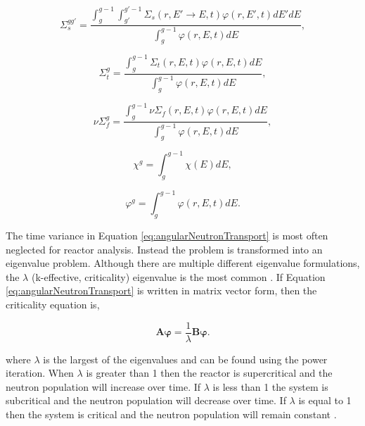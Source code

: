\begin{equation}
    \Sigma_{s}^{gg'} = \frac{\int_{g}^{g-1}\int_{g'}^{g'-1}\Sigma_{s}(r,E'\rightarrow E,t)\varphi(r,E',t) dE'dE}{\int_{g}^{g-1}\varphi(r,E,t) dE},
\end{equation}

\begin{equation}
    \Sigma_{t}^{g} = \frac{\int_{g}^{g-1}\Sigma_{t}(r,E,t)\varphi(r,E,t) dE}{\int_{g}^{g-1}\varphi(r,E,t) dE},
\end{equation}

\begin{equation}
    \nu\Sigma_{f}^{g} = \frac{\int_{g}^{g-1}\nu\Sigma_{f}(r,E,t)\varphi(r,E,t) dE}{\int_{g}^{g-1}\varphi(r,E,t) dE},
\end{equation}

\begin{equation}
    \chi^{g} = \int_{g}^{g-1}\chi(E) dE,
\end{equation}

\begin{equation}
    \varphi^{g} = \int_{g}^{g-1}\varphi(r,E,t) dE.
\end{equation}

The time variance in Equation \ref{eq:angularNeutronTransport} is most often neglected for reactor analysis. Instead the problem is transformed into an eigenvalue problem. Although there are multiple different eigenvalue formulations, the $\lambda$ (k-effective, criticality) eigenvalue is the most common \cite{millerCompTransport}. If Equation \ref{eq:angularNeutronTransport} is written in matrix vector form, then the criticality equation is,

\begin{equation}
    \boldsymbol{A}\boldsymbol{\varphi} = \frac{1}{\lambda}\boldsymbol{B}\boldsymbol{\varphi}.
\end{equation}

\noindent where $\lambda$ is the largest of the eigenvalues and can be found using the power iteration. When $\lambda$ is greater than 1 then the reactor is supercritical and the neutron population will increase over time. If $\lambda$ is less than 1 the system is subcritical and the neutron population will decrease over time. If $\lambda$ is equal to 1 then the system is critical and the neutron population will remain constant \cite{duderstadt1976}. 


